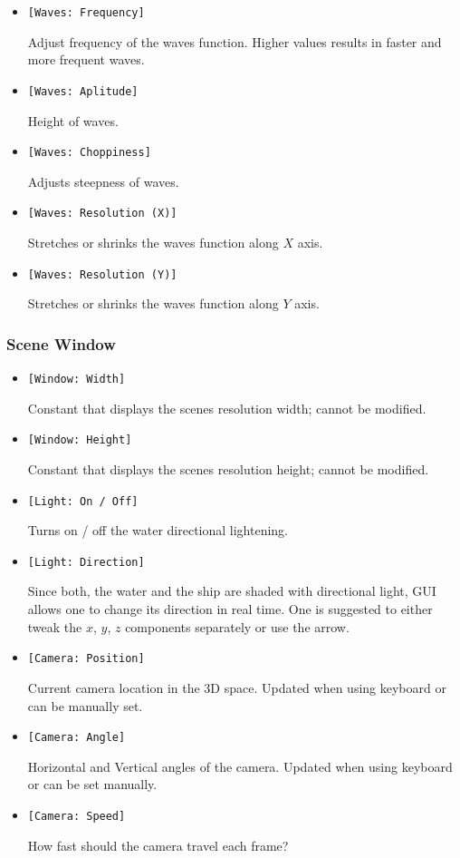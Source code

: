 \documentclass{report}
\begin{document}
\begin{itemize}
\item \texttt{[Waves: Frequency]}

Adjust frequency of the waves function. Higher values results in faster and more frequent waves.

\item \texttt{[Waves: Aplitude]}

Height of waves. 

\item \texttt{[Waves: Choppiness]}

Adjusts steepness of waves.

\item \texttt{[Waves: Resolution (X)]}

Stretches or shrinks the waves function along $X$ axis.

\item \texttt{[Waves: Resolution (Y)]}

Stretches or shrinks  the waves function along $Y$ axis.
\end{itemize}


\subsubsection{Scene Window}
\begin{itemize}
\item \texttt{[Window: Width]}

Constant that displays the scenes resolution width; cannot be modified.

\item \texttt{[Window: Height]}

Constant that displays the scenes resolution height; cannot be modified.

\item \texttt{[Light: On / Off]}

Turns on / off the water directional lightening.

\item \texttt{[Light: Direction]}

Since both, the water and the ship are shaded with directional light, GUI allows one to change its direction in real time. One is suggested to either tweak the $x$, $y$, $z$ components separately or use the arrow.

\item \texttt{[Camera: Position]}

Current camera location in the 3D space. Updated when using keyboard or 
can be manually set.

\item \texttt{[Camera: Angle]}

Horizontal and Vertical angles of the camera. Updated when using keyboard or can be set manually.

\item \texttt{[Camera: Speed]}

How fast should the camera travel each frame?

\end{itemize}
\end{document}
